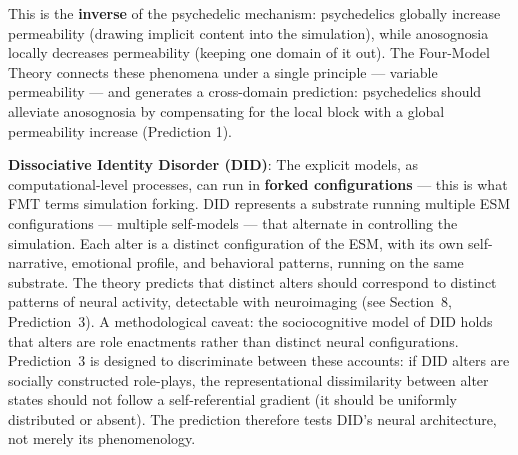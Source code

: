 \documentclass[12pt]{article}
\newcommand{\revstart}{}
\newcommand{\revend}{}
\begin{document}
This is the \textbf{inverse} of the psychedelic mechanism: psychedelics globally increase permeability (drawing implicit content into the simulation), while anosognosia locally decreases permeability (keeping one domain of it out). The Four-Model Theory connects these phenomena under a single principle --- variable permeability --- and generates a cross-domain prediction: psychedelics should alleviate anosognosia by compensating for the local block with a global permeability increase (Prediction 1).

\textbf{Dissociative Identity Disorder (DID)}: The explicit models, as computational-level processes, can run in \textbf{forked configurations} --- this is what FMT terms simulation forking. DID represents a substrate running multiple ESM configurations --- multiple self-models --- that alternate in controlling the simulation. Each alter is a distinct configuration of the ESM, with its own self-narrative, emotional profile, and behavioral patterns, running on the same substrate. The theory predicts that distinct alters should correspond to distinct patterns of neural activity, detectable with neuroimaging (see Section~8, Prediction~3). {\revstart A methodological caveat: the sociocognitive model of DID \citep{Lilienfeld1999,Lynn2012} holds that alters are role enactments rather than distinct neural configurations. Prediction~3 is designed to discriminate between these accounts: if DID alters are socially constructed role-plays, the representational dissimilarity between alter states should not follow a self-referential gradient (it should be uniformly distributed or absent). The prediction therefore tests DID's neural architecture, not merely its phenomenology.\revend}
\end{document}
